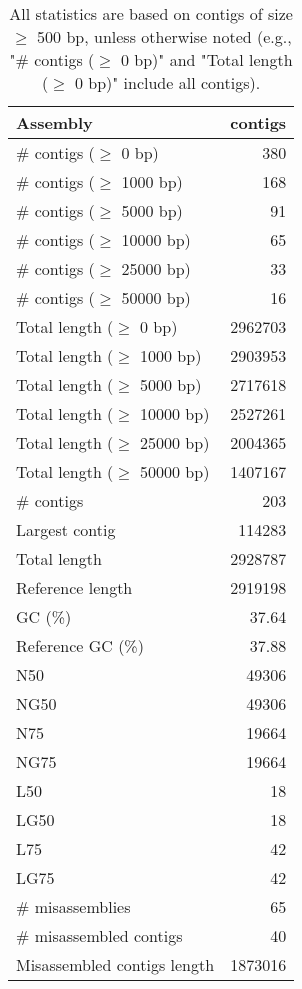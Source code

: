 \documentclass[12pt,a4paper]{article}
\begin{document}
\begin{table}[ht]
\begin{center}
\caption{All statistics are based on contigs of size $\geq$ 500 bp, unless otherwise noted (e.g., "\# contigs ($\geq$ 0 bp)" and "Total length ($\geq$ 0 bp)" include all contigs).}
\begin{tabular}{|l*{1}{|r}|}
\hline
Assembly & contigs \\ \hline
\# contigs ($\geq$ 0 bp) & 380 \\ \hline
\# contigs ($\geq$ 1000 bp) & 168 \\ \hline
\# contigs ($\geq$ 5000 bp) & 91 \\ \hline
\# contigs ($\geq$ 10000 bp) & 65 \\ \hline
\# contigs ($\geq$ 25000 bp) & 33 \\ \hline
\# contigs ($\geq$ 50000 bp) & 16 \\ \hline
Total length ($\geq$ 0 bp) & 2962703 \\ \hline
Total length ($\geq$ 1000 bp) & 2903953 \\ \hline
Total length ($\geq$ 5000 bp) & 2717618 \\ \hline
Total length ($\geq$ 10000 bp) & 2527261 \\ \hline
Total length ($\geq$ 25000 bp) & 2004365 \\ \hline
Total length ($\geq$ 50000 bp) & 1407167 \\ \hline
\# contigs & 203 \\ \hline
Largest contig & 114283 \\ \hline
Total length & 2928787 \\ \hline
Reference length & 2919198 \\ \hline
GC (\%) & 37.64 \\ \hline
Reference GC (\%) & 37.88 \\ \hline
N50 & 49306 \\ \hline
NG50 & 49306 \\ \hline
N75 & 19664 \\ \hline
NG75 & 19664 \\ \hline
L50 & 18 \\ \hline
LG50 & 18 \\ \hline
L75 & 42 \\ \hline
LG75 & 42 \\ \hline
\# misassemblies & 65 \\ \hline
\# misassembled contigs & 40 \\ \hline
Misassembled contigs length & 1873016 \\ \hline

\end{tabular}
\end{center}
\end{table}
\end{document}
